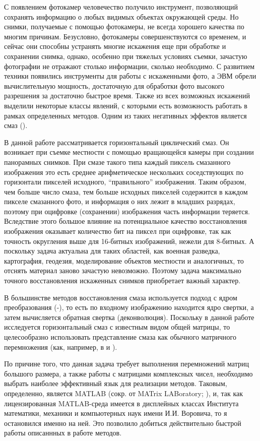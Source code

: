 \documentclass[a4paper]{article}
\theoremstyle{definition}
\begin{document}
    С появлением фотокамер человечество получило инструмент, позволяющий сохранять информацию о любых видимых объектах окружающей среды. Но снимки, получаемые с помощью фотокамеры, не всегда хорошего качества по многим причинам. Безусловно, фотокамеры совершенствуются со временем, и сейчас они способны устранять многие искажения еще при обработке и сохранении снимка, однако, особенно при тяжелых условиях съемки, зачастую фотографии не отражают столько информации, сколько необходимо. С развитием техники появились инструменты для работы с искаженными фото, а ЭВМ обрели вычислительную мощность, достаточную для обработки фото высокого разрешения за достаточно быстрое время. Также из всех возможных искажений выделили некоторые классы явлений, с которыми есть возможность работать в рамках определенных методов. Одним из таких негативных эффектов является смаз (\cite{blur_def}).


    В данной работе рассматривается горизонтальный циклический смаз. Он возникает при съемке местности с помощью вращающейся камеры при создании панорамных снимков. При смазе такого типа каждый пиксель смазанного изображения это есть среднее арифметическое нескольких соседствующих по горизонтали пикселей исходного, ``правильного'' изображения. Таким образом, чем больше число смаза, тем больше исходных пикселей содержится в каждом пикселе смазанного фото, и информация о них лежит в младших разрядах, поэтому при оцифровке (сохранении) изображения часть информации теряется. Вследствие этого большое влияние на потенциальное качество восстановления изображения оказывает количество бит на пиксел при оцифровке, так как точность округления выше для 16-битных изображений, нежели для 8-битных. А поскольку задача актуальна для таких областей, как военная разведка, картография, геодезия, моделирование объектов местности и аналогичных, то отснять материал заново зачастую невозможно. Поэтому задача максимально точного восстановления искаженных снимков приобретает важный характер.


    В большинстве методов восстановления смаза используется подход с ядром преобразования (\cite{kernel1}-\cite{kernel2}), то есть по входному изображению находится ядро свертки, а затем вычисляется обратная свертка (деконволюция). Поскольку в данной работе исследуется горизонтальный смаз с известным видом общей матрицы, то целесообразно использовать представление смаза как обычного матричного перемножения (как, например, в \cite{model_proc} и \cite{cond}).


    По причине того, что данная задача требует выполнения перемножений матриц большого размера, а также работы с матрицами комплексных чисел, необходимо выбрать наиболее эффективный язык для реализации методов. Таковым, определенно, является MATLAB (сокр. от MATrix LABoratory; \cite{matlab}), и, так как лицензированная MATLAB-среда имеется в дисплейных классах Института математики, механики и компьютерных наук имени И.И. Воровича, то я остановился именно на ней. Это позволило добиться действительно быстрой работы описаннных в работе методов.
\end{document}
